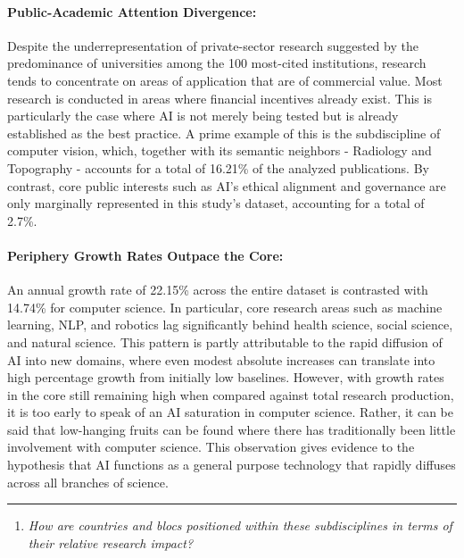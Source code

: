 \documentclass{article}
\begin{document}
	\paragraph{Public-Academic Attention Divergence:} Despite the underrepresentation of private-sector research suggested by the predominance of universities among the 100 most-cited institutions, research tends to concentrate on areas of application that are of commercial value. Most research is conducted in areas where financial incentives already exist. This is particularly the case where AI is not merely being tested but is already established as the best practice. A prime example of this is the subdiscipline of computer vision, which, together with its semantic neighbors - Radiology and Topography - accounts for a total of 16.21\% of the analyzed publications. By contrast, core public interests such as AI's ethical alignment and governance are only marginally represented in this study's dataset, accounting for a total of 2.7\%.  
	
	
	\paragraph{Periphery Growth Rates Outpace the Core:} An annual growth rate of 22.15\% across the entire dataset is contrasted with 14.74\% for computer science. In particular, core research areas such as machine learning, NLP, and robotics lag significantly behind health science, social science, and natural science. This pattern is partly attributable to the rapid diffusion of AI into new domains, where even modest absolute increases can translate into high percentage growth from initially low baselines. However, with growth rates in the core still remaining high when compared against total research production, it is too early to speak of an AI saturation in computer science. Rather, it can be said that low-hanging fruits can be found where there has traditionally been little involvement with computer science. This observation gives evidence to the hypothesis that AI functions as a general purpose technology that rapidly diffuses across all branches of science.
	
	\vspace{1em}
	\rule{\linewidth}{0.4pt}
	
	\begin{enumerate}
		\item[\textbf{RQ2}]\hspace*{2em}\parbox[t]{\dimexpr\linewidth-2em}{
			\textit{How are countries and blocs positioned within these subdisciplines in terms of their relative research impact?}
		}
	\end{enumerate}
	
\end{document}
